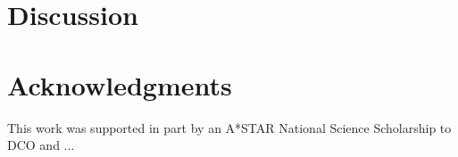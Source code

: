 \documentclass[10pt,letterpaper]{article}
\begin{document}
\section{Discussion}


\section{Acknowledgments}

This work was supported in part by an A*STAR National Science Scholarship to DCO and ...



\setlength{\bibleftmargin}{.125in}
\setlength{\bibindent}{-\bibleftmargin}


\end{document}
